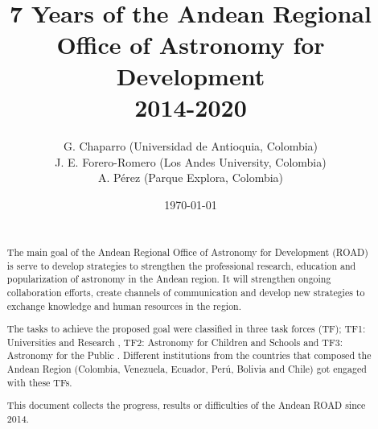 \documentclass[paper=a4, fontsize=11pt]{scrartcl} %
\title{	
\normalfont \normalsize 
\textsc{} \\ [25pt] %
\horrule{0.5pt} \\[0.4cm] %
\huge  7 Years of the Andean Regional Office of Astronomy for Development\\ 2014-2020 %
\horrule{2pt} \\[0.5cm] %
}
\author{G. Chaparro (Universidad de Antioquia, Colombia)\\
J. E. Forero-Romero (Los Andes University, Colombia)\\
A. P\'erez (Parque Explora, Colombia)} %
\date{\normalsize\today} %
\numberwithin{equation}{section} %
\numberwithin{figure}{section} %
\numberwithin{table}{section} %
\begin{document}
\maketitle %

\newpage
\begin{abstract}

{ }\\

The main goal of the Andean Regional Office of Astronomy for
Development (ROAD) is serve to develop strategies to strengthen the
professional research, education and popularization of astronomy in
the Andean region. It will strengthen ongoing collaboration efforts,
create channels of communication and develop new strategies to
exchange knowledge and human resources in the region. 


The tasks to achieve the proposed goal were classified in three task
forces (TF); TF1: Universities and Research , TF2: Astronomy for Children
and Schools and TF3: Astronomy for the Public . Different institutions
from the countries that composed the Andean Region (Colombia,
Venezuela, Ecuador, Perú, Bolivia and Chile) got engaged with these
TFs. 


This document collects the progress, results or difficulties of the
Andean ROAD since 2014.  

\end{abstract}

\newpage
\tableofcontents










%


%
%
\end{document}
